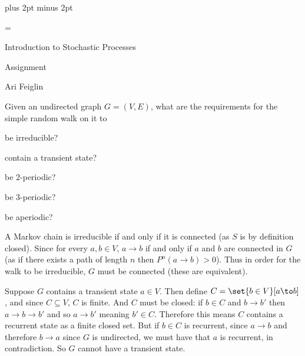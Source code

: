 

\parindent=0cm
\parskip=3pt plus 2pt minus 2pt





\footline={}

\def\printmcount{\the\counter{section}.\the\counter{math counter}}
\setcounter{section}{3}


{

    \centerline{Introduction to Stochastic Processes}
    \smallskip
    \centerline{Assignment \the{}}
    \centerline{Ari Feiglin}

\eppbox}

\bigskip

\bexerc

    Given an undirected graph $G=(V,E)$, what are the requirements for the simple random walk on it to
    \benum
        \item be irreducible?
        \item contain a transient state?
        \item be $2$-periodic?
        \item be $3$-periodic?
        \item be aperiodic?
    \eenum

\eexerc

\benum
    \item A Markov chain is irreducible if and only if it is connected (as $S$ is by definition closed).
    Since for every $a,b\in V$, $a\to b$ if and only if $a$ and $b$ are connected in $G$ (as if there exists a path of length $n$ then $P^n(a\to b)>0$).
    Thus in order for the walk to be irreducible, $G$ must be connected (these are equivalent).

    \item Suppose $G$ contains a transient state $a\in V$.
    Then define $C=\set{b\in V}[a\to b]$, and since $C\subseteq V$, $C$ is finite.
    And $C$ must be closed: if $b\in C$ and $b\to b'$ then $a\to b\to b'$ and so $a\to b'$ meaning $b'\in C$.
    Therefore this means $C$ contains a recurrent state as a finite closed set.
    But if $b\in C$ is recurrent, since $a\to b$ and therefore $b\to a$ since $G$ is undirected, we must have that $a$ is recurrent, in contradiction.
    So $G$ cannot have a transient state.

